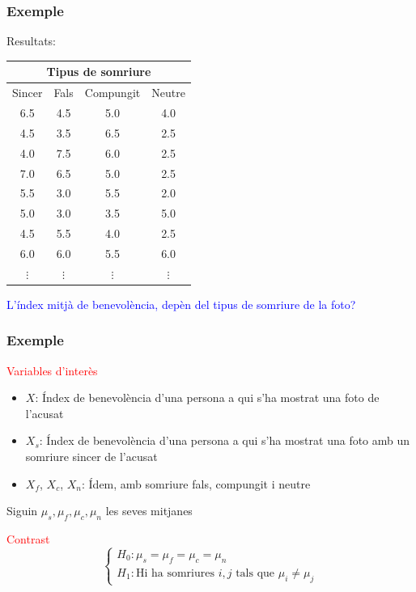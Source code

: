 \documentclass[12pt,t]{beamer}
\newcommand{\red}[1]{\textcolor{red}{#1}}
\newcommand{\blue}[1]{\textcolor{blue}{#1}}
\theoremstyle{plain}
\theoremstyle{definition}
\begin{document}
\begin{frame}
\frametitle{Exemple}

Resultats: 
\begin{center}
\begin{tabular}{cccc}
\multicolumn{4}{c}{Tipus de somriure}\\\hline
Sincer & Fals & Compungit & Neutre\\\hline
6.5 &4.5 &  5.0  &  4.0 \\
4.5 &3.5 & 6.5  &  2.5  \\
4.0 &7.5 & 6.0  &  2.5  \\
7.0  &6.5 & 5.0  &  2.5  \\
5.5 & 3.0 & 5.5  & 2.0  \\
5.0  &3.0 & 3.5  &  5.0  \\
4.5  &5.5 & 4.0  & 2.5  \\
6.0 & 6.0 &5.5  &6.0    \\
$\vdots$ & $\vdots$ & $\vdots$ & $\vdots$ 
\end{tabular}
\end{center}\pause\medskip

\blue{L'índex mitjà de benevolència, depèn del tipus de somriure de la foto?}
\end{frame}



\begin{frame}
\frametitle{Exemple}

\red{Variables d'interès}\medskip
\begin{itemize}
\item $X$: Índex de benevolència d'una persona a qui s'ha mostrat una foto de l'acusat\smallskip

\item $X_s$: Índex de benevolència d'una persona a qui s'ha mostrat una foto amb un somriure sincer de l'acusat\medskip

\item $X_f$, $X_c$, $X_n$: Ídem, amb somriure fals, compungit i neutre
\end{itemize}
\medskip

Siguin $\mu_s,\mu_f,\mu_c,\mu_n$ les seves mitjanes\medskip

\red{Contrast}
$$
\left\{
\begin{array}{l}
H_0 : \mu_s=\mu_{f}=\mu_{c}=\mu_{n} \\
H_1 : \mbox{Hi ha  somriures }i,j\mbox{ tals que }  \mu_i \not=\mu_j
\end{array}
\right.
$$

\end{frame}
\end{document}
